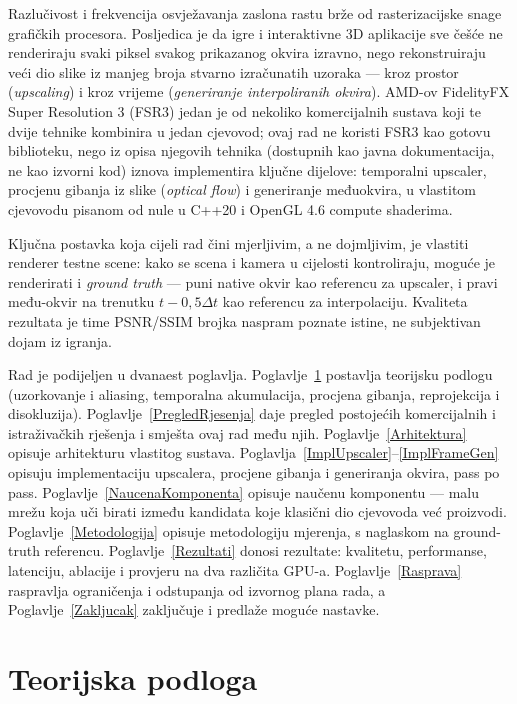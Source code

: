 \documentclass{mathos}
\begin{document}
Razlučivost i frekvencija osvježavanja zaslona rastu brže od rasterizacijske
snage grafičkih procesora. Posljedica je da igre i interaktivne 3D aplikacije
sve češće ne renderiraju svaki piksel svakog prikazanog okvira izravno, nego
rekonstruiraju veći dio slike iz manjeg broja stvarno izračunatih uzoraka —
kroz prostor (\emph{upscaling}) i kroz vrijeme (\emph{generiranje
interpoliranih okvira}). AMD-ov FidelityFX Super Resolution 3 (FSR3) jedan je
od nekoliko komercijalnih sustava koji te dvije tehnike kombinira u jedan
cjevovod; ovaj rad ne koristi FSR3 kao gotovu biblioteku, nego iz opisa
njegovih tehnika (dostupnih kao javna dokumentacija, ne kao izvorni kod)
iznova implementira ključne dijelove: temporalni upscaler, procjenu gibanja
iz slike (\emph{optical flow}) i generiranje međuokvira, u vlastitom
cjevovodu pisanom od nule u C++20 i OpenGL 4.6 compute shaderima.

Ključna postavka koja cijeli rad čini mjerljivim, a ne dojmljivim, je vlastiti
renderer testne scene: kako se scena i kamera u cijelosti kontroliraju, moguće
je renderirati i \emph{ground truth} — puni native okvir kao referencu za
upscaler, i pravi među-okvir na trenutku $t-0,5\Delta t$ kao referencu za
interpolaciju. Kvaliteta rezultata je time PSNR/SSIM brojka naspram poznate
istine, ne subjektivan dojam iz igranja.

Rad je podijeljen u dvanaest poglavlja. Poglavlje~\ref{TeorijskaPodloga}
postavlja teorijsku podlogu (uzorkovanje i aliasing, temporalna akumulacija,
procjena gibanja, reprojekcija i disokluzija). Poglavlje~\ref{PregledRjesenja}
daje pregled postojećih komercijalnih i istraživačkih rješenja i smješta ovaj
rad među njih. Poglavlje~\ref{Arhitektura} opisuje arhitekturu vlastitog
sustava. Poglavlja~\ref{ImplUpscaler}--\ref{ImplFrameGen} opisuju
implementaciju upscalera, procjene gibanja i generiranja okvira, pass po
pass. Poglavlje~\ref{NaucenaKomponenta} opisuje naučenu komponentu — malu
mrežu koja uči birati između kandidata koje klasični dio cjevovoda već
proizvodi. Poglavlje~\ref{Metodologija} opisuje metodologiju mjerenja, s
naglaskom na ground-truth referencu. Poglavlje~\ref{Rezultati} donosi
rezultate: kvalitetu, performanse, latenciju, ablacije i provjeru na dva
različita GPU-a. Poglavlje~\ref{Rasprava} raspravlja ograničenja i
odstupanja od izvornog plana rada, a Poglavlje~\ref{Zakljucak} zaključuje i
predlaže moguće nastavke.


\chapter{Teorijska podloga}\label{TeorijskaPodloga}
\end{document}
